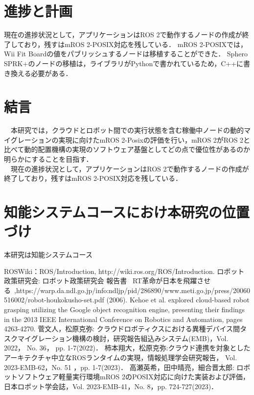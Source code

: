 \documentclass[11pt]{ujarticle}
\begin{document}
\section{進捗と計画}
現在の進捗状況として，アプリケーションはROS 2で動作するノードの作成が終了しており，残すはmROS 2-POSIX対応を残している．
mROS 2-POSIXでは，Wii Fit Boardの値をパブリッシュするノードは移植することができた．
Sphero SPRK+のノードの移植は，ライブラリがPythonで書かれているため，C++に書き換える必要がある．

\section{結言}
　本研究では，クラウドとロボット間での実行状態を含む稼働中ノードの動的マイグレーションの実現に向けたmROS 2-Posixの評価を行い，mROS 2がROS 2と比べて動的配置機構の実現のソフトウェア基盤としてどの点で優位性があるのか明らかにすることを目指す．
\\　現在の進捗状況として，アプリケーションはROS 2で動作するノードの作成が終了しており，残すはmROS 2-POSIX対応を残している．

\section{知能システムコースにおけ本研究の位置づけ}
 本研究は知能システムコース


\begin{thebibliography}{99}
	ROSWiki：ROS/Introduction, http://wiki.ros.org/ROS/Introduction.
	ロボット政策研究会: ロボット政策研究会 報告書 ~RT革命が日本を飛躍させる~,https://warp.da.ndl.go.jp/info:ndljp/pid/286890/www.meti.go.jp/press/20060516002/robot-houkokusho-set.pdf (2006).
	Kehoe et al. explored cloud-based robot grasping utilizing the Google object recognition engine, presenting their findings in the 2013 IEEE International Conference on Robotics and Automation, pages 4263-4270.
	菅文人，松原克弥: クラウドロボティクスにおける異種デバイス間タスクマイグレーション機構の検討，研究報告組込みシステム(EMB)，Vol. 2022， No. 36， pp. 1-7(2022)．
	柿本翔大，松原克弥:クラウド連携を対象としたアーキテクチャ中立なROSランタイムの実現，情報処理学会研究報告， Vol. 2023-EMB-62，No. 51 ，pp. 1-7(2023)．
	高瀬英希，田中晴亮，細合晋太郎: ロボットソフトウェア軽量実行環境mROS 2のPOSIX対応に向けた実装および評価，日本ロボット学会誌，Vol. 2023-EMB-41，No. 8，pp. 724-727(2023)．
\end{thebibliography}
\end{document}
